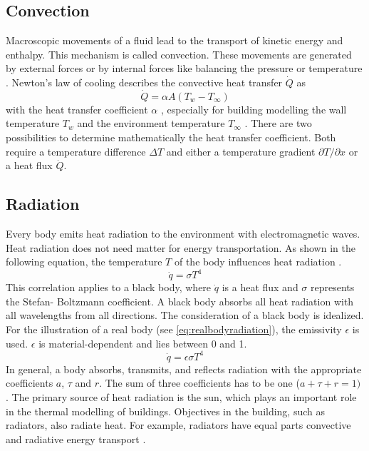 \subsection{Convection}
\label{subsection:convection}

    Macroscopic movements of a fluid lead to the transport of kinetic energy and enthalpy. This mechanism is called convection. These movements are generated by external forces or by internal forces like balancing the pressure or temperature \cite{.2013}.
    \newline
    Newton's law of cooling describes the convective heat transfer $\dot{Q}$ as 
    \begin{equation}
    \label{eq:newton}
        \dot{Q} = \alpha A (T_w - T_\infty)
    \end{equation}
    with the heat transfer coefficient $\alpha$ , especially for building modelling the wall temperature $T_w$ and the environment temperature $T_\infty$ \cite{Griesinger.2019}
    . There are two possibilities to determine mathematically the heat transfer coefficient. Both require a temperature difference $\Delta T$ and either a temperature gradient $\partial T/\partial x$  or a heat flux $\dot{Q}$.
    \cite{.2013} 

\subsection{Radiation}
\label{subsection:radiation}

    Every body emits heat radiation to the environment with electromagnetic waves. Heat radiation does not need matter for energy transportation. As shown in the following equation, the temperature $T$ of the body influences heat radiation \cite{.2013}. 
    \begin{equation}
    \label{eq:radiation}
        \dot{q} = \sigma T^4
    \end{equation}
    This correlation applies to a black body, where $\dot{q}$ is a heat flux and $\sigma$ represents the Stefan- Boltzmann coefficient. A black body absorbs all heat radiation with all wavelengths from all directions\cite{Griesinger.2019}. The consideration of a black body is idealized. For the illustration of a real body (see \autoref{eq:realbodyradiation}), the emissivity $\epsilon$ is used. $\epsilon$ is material-dependent and lies between 0 and 1.
    \begin{equation}
    \label{eq:realbodyradiation}
        \dot{q} = \epsilon \sigma T^4
    \end{equation}
    In general, a body absorbs, transmits, and reflects radiation with the appropriate coefficients $a$, $\tau$ and $r$. The sum of three coefficients has to be one ($a + \tau + r = 1)$
    \cite{Baehr.2016}.
    \newline
    The primary source of heat radiation is the sun, which plays an important role in the thermal modelling of buildings. Objectives in the building, such as radiators, also radiate heat. For example, radiators have equal parts convective and radiative energy transport \cite{Hazyuk.2012}. 
    
